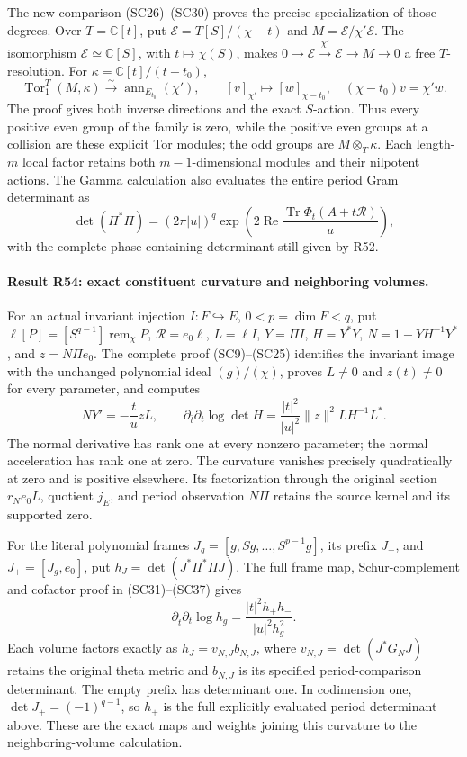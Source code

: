 The new comparison (SC26)--(SC30) proves the precise specialization
of those degrees. Over \(T=\mathbb C[t]\), put
\(\mathscr E=T[S]/(\chi-t)\) and \(M=\mathscr E/\chi'\mathscr E\).
The isomorphism \(\mathscr E\simeq\mathbb C[S]\), with
\(t\mapsto\chi(S)\), makes
\(0\to\mathscr E\xrightarrow{\chi'}\mathscr E\to M\to0\)
a free \(T\)-resolution. For \(\kappa=\mathbb C[t]/(t-t_0)\),
\[
 \operatorname{Tor}_1^T(M,\kappa)
 \xrightarrow{\sim}\operatorname{ann}_{E_{t_0}}(\chi'),
 \qquad [v]_{\chi'}\longmapsto[w]_{\chi-t_0},
 \quad(\chi-t_0)v=\chi'w.
\]
The proof gives both inverse directions and the exact \(S\)-action.
Thus every positive even group of the family is zero, while the
positive even groups at a collision are these explicit Tor modules;
the odd groups are \(M\otimes_T\kappa\). Each length-\(m\) local
factor retains both \(m-1\)-dimensional modules and their nilpotent
actions. The Gamma calculation also evaluates the entire period
Gram determinant as
\[
 \det(\Pi^*\Pi)=(2\pi|u|)^q
  \exp\left(2\operatorname{Re}
          \frac{\operatorname{Tr}\Phi_t(A+t\mathcal R)}u\right),
\]
with the complete phase-containing determinant still given by R52.

\paragraph{Result R54: exact constituent curvature and neighboring volumes.}
For an actual invariant injection \(I:F\hookrightarrow E\),
\(0<p=\dim F<q\), put
\(\ell[P]=[S^{q-1}]\operatorname{rem}_\chi P\),
\(\mathcal R=e_0\ell\), \(L=\ell I\),
\(Y=\Pi I\), \(H=Y^*Y\),
\(N=1-YH^{-1}Y^*\), and \(z=N\Pi e_0\).
The complete proof (SC9)--(SC25) identifies the invariant image
with the unchanged polynomial ideal \((g)/(\chi)\), proves
\(L\ne0\) and \(z(t)\ne0\) for every parameter, and computes
\[
 NY'=-\frac t u zL,\qquad
 \partial_{\bar t}\partial_t\log\det H
    =\frac{|t|^2}{|u|^2}\|z\|^2LH^{-1}L^*.
\]
The normal derivative has rank one at every nonzero parameter;
the normal acceleration has rank one at zero. The curvature
vanishes precisely quadratically at zero and is positive elsewhere.
Its factorization through the original section \(r_Ne_0L\),
quotient \(j_E\), and period observation \(N\Pi\) retains the
source kernel and its supported zero.

For the literal polynomial frames
\(J_g=[g,Sg,\ldots,S^{p-1}g]\), its prefix \(J_-\), and
\(J_+=[J_g,e_0]\), put
\(h_J=\det(J^*\Pi^*\Pi J)\). The full frame map,
Schur-complement and cofactor proof in (SC31)--(SC37) gives
\[
 \partial_{\bar t}\partial_t\log h_g
       =\frac{|t|^2h_+h_-}{|u|^2h_g^2}.
\]
Each volume factors exactly as \(h_J=v_{N,J}b_{N,J}\), where
\(v_{N,J}=\det(J^*G_NJ)\) retains the original theta metric
and \(b_{N,J}\) is its specified period-comparison determinant.
The empty prefix has determinant one. In codimension one,
\(\det J_+=(-1)^{q-1}\), so \(h_+\) is the full explicitly
evaluated period determinant above. These are the exact maps and
weights joining this curvature to the neighboring-volume calculation.

